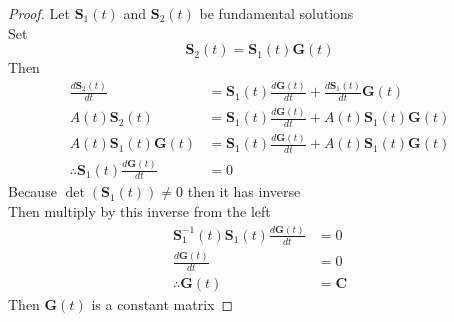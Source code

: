 \begin{proof}[\textcolor{theme}{Proof}]
    Let $\mathbf{S}_1(t)$ and $\mathbf{S}_2(t)$ be fundamental solutions
    \\
    Set
    \[
        \mathbf{S}_2(t) = \mathbf{S}_1(t)\mathbf{G}(t)
    \]
    Then
    \begin{align*}
        \frac{d\mathbf{S}_2(t)}{dt}                         & = \mathbf{S}_1(t)\frac{d\mathbf{G}(t)}{dt} + \frac{d\mathbf{S}_1(t)}{dt}\mathbf{G}(t)
        \\
        A(t)\mathbf{S}_2(t)                                 & = \mathbf{S}_1(t)\frac{d\mathbf{G}(t)}{dt} + A(t)\mathbf{S}_1(t)\mathbf{G}(t)
        \\
        A(t)\mathbf{S}_1(t)\mathbf{G}(t)                    & = \mathbf{S}_1(t)\frac{d\mathbf{G}(t)}{dt} + A(t)\mathbf{S}_1(t)\mathbf{G}(t)
        \\
        \therefore \mathbf{S}_1(t)\frac{d\mathbf{G}(t)}{dt} & = 0
    \end{align*}
    Because $\det(\mathbf{S}_1(t))\neq 0$ then it has inverse
    \\
    Then multiply by this inverse from the left
    \begin{align*}
        \mathbf{S}_1^{-1}(t)\mathbf{S}_1(t)\frac{d\mathbf{G}(t)}{dt} & = 0
        \\
        \frac{d\mathbf{G}(t)}{dt}                                    & = 0
        \\
        \therefore \mathbf{G}(t)                                     & = \mathbf{C}
    \end{align*}
    Then $\mathbf{G}(t)$ is a constant matrix
\end{proof}

